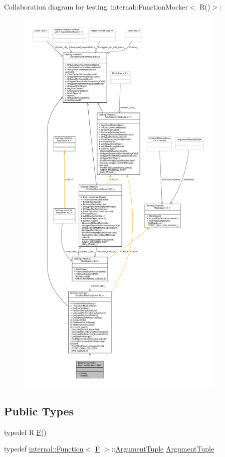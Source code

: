 Collaboration diagram for testing\+:\+:internal\+:\+:Function\+Mocker$<$ R()$>$\+:
\nopagebreak
\begin{figure}[H]
\begin{center}
\leavevmode
\includegraphics[height=550pt]{classtesting_1_1internal_1_1FunctionMocker_3_01R_07_08_4__coll__graph}
\end{center}
\end{figure}
\subsection*{Public Types}
\begin{DoxyCompactItemize}
\item 
typedef R \hyperlink{classtesting_1_1internal_1_1FunctionMocker_3_01R_07_08_4_a2c1d7da413176d87405227df90a95521}{F}()
\item 
typedef \hyperlink{structtesting_1_1internal_1_1Function}{internal\+::\+Function}$<$ \hyperlink{classtesting_1_1internal_1_1FunctionMocker_3_01R_07_08_4_a2c1d7da413176d87405227df90a95521}{F} $>$\+::\hyperlink{classtesting_1_1internal_1_1FunctionMocker_3_01R_07_08_4_a5a279e0d8414bf0809405c06a0725b66}{Argument\+Tuple} \hyperlink{classtesting_1_1internal_1_1FunctionMocker_3_01R_07_08_4_a5a279e0d8414bf0809405c06a0725b66}{Argument\+Tuple}
\end{DoxyCompactItemize}
